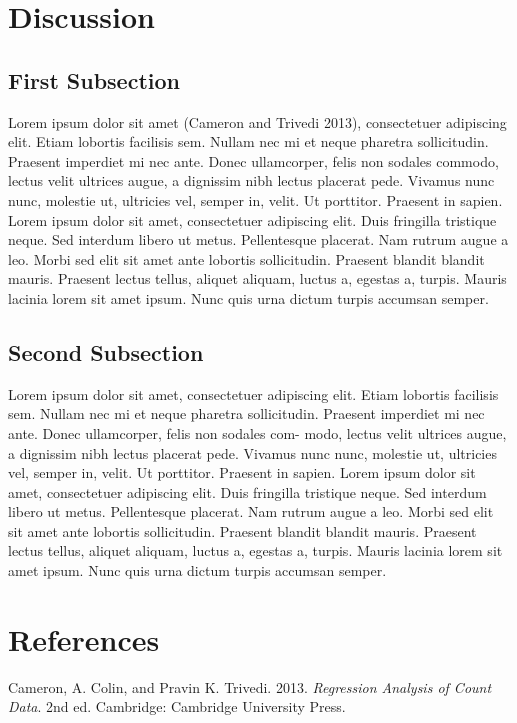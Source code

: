 \documentclass[
  9pt,
  twocolumn,
  twoside]{turbo}%
\newlength{\cslhangindent}
\newlength{\cslentryspacingunit} %
\newenvironment{CSLReferences}[2] %
 {%
  \setlength{\parindent}{0pt}
  \ifodd #1
  \let\oldpar\par
  \def\par{\hangindent=\cslhangindent\oldpar}
  \fi
  \setlength{\parskip}{#2\cslentryspacingunit}
 }%
 {}
\begin{document}
\hypertarget{sec-discussion}{%
\section{Discussion}\label{sec-discussion}}

\hypertarget{first-subsection}{%
\subsection{First Subsection}\label{first-subsection}}

Lorem ipsum dolor sit amet (Cameron and Trivedi 2013), consectetuer
adipiscing elit. Etiam lobortis facilisis sem. Nullam nec mi et neque
pharetra sollicitudin. Praesent imperdiet mi nec ante. Donec
ullamcorper, felis non sodales commodo, lectus velit ultrices augue, a
dignissim nibh lectus placerat pede. Vivamus nunc nunc, molestie ut,
ultricies vel, semper in, velit. Ut porttitor. Praesent in sapien. Lorem
ipsum dolor sit amet, consectetuer adipiscing elit. Duis fringilla
tristique neque. Sed interdum libero ut metus. Pellentesque placerat.
Nam rutrum augue a leo. Morbi sed elit sit amet ante lobortis
sollicitudin. Praesent blandit blandit mauris. Praesent lectus tellus,
aliquet aliquam, luctus a, egestas a, turpis. Mauris lacinia lorem sit
amet ipsum. Nunc quis urna dictum turpis accumsan semper.

\hypertarget{second-subsection}{%
\subsection{Second Subsection}\label{second-subsection}}

Lorem ipsum dolor sit amet, consectetuer adipiscing elit. Etiam lobortis
facilisis sem. Nullam nec mi et neque pharetra sollicitudin. Praesent
imperdiet mi nec ante. Donec ullamcorper, felis non sodales com- modo,
lectus velit ultrices augue, a dignissim nibh lectus placerat pede.
Vivamus nunc nunc, molestie ut, ultricies vel, semper in, velit. Ut
porttitor. Praesent in sapien. Lorem ipsum dolor sit amet, consectetuer
adipiscing elit. Duis fringilla tristique neque. Sed interdum libero ut
metus. Pellentesque placerat. Nam rutrum augue a leo. Morbi sed elit sit
amet ante lobortis sollicitudin. Praesent blandit blandit mauris.
Praesent lectus tellus, aliquet aliquam, luctus a, egestas a, turpis.
Mauris lacinia lorem sit amet ipsum. Nunc quis urna dictum turpis
accumsan semper.

\hypertarget{references}{%
\section*{References}\label{references}}

\hypertarget{refs}{}
\begin{CSLReferences}{1}{0}
\leavevmode{}%
Cameron, A. Colin, and Pravin K. Trivedi. 2013. \emph{Regression
Analysis of Count Data}. 2nd ed. Cambridge: Cambridge University Press.

\end{CSLReferences}
\end{document}
